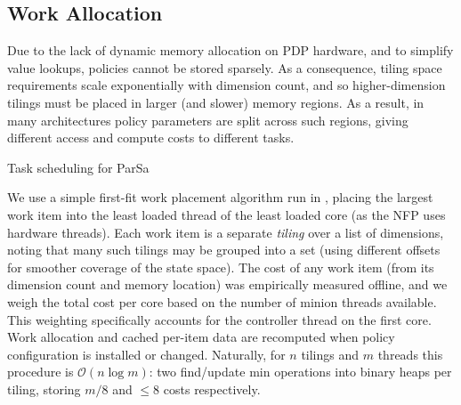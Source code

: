 
\subsection{Work Allocation}\label{sec:work-allocation}
Due to the lack of dynamic memory allocation on PDP hardware, and to simplify value lookups, policies cannot be stored sparsely.
As a consequence, tiling space requirements scale exponentially with dimension count, and so higher-dimension tilings must be placed in larger (and slower) memory regions.
As a result, in many architectures policy parameters are split across such regions, giving different access and compute costs to different tasks.

\begin{algorithm}
	\caption{Task scheduling for ParSa\label{alg:parsa-schedule}}
\end{algorithm}

We use a simple first-fit work placement algorithm run in \approachshort{}, placing the largest work item into the least loaded thread of the least loaded core (as the NFP uses hardware threads).
Each work item is a separate \emph{tiling} over a list of dimensions, noting that many such tilings may be grouped into a set (using different offsets for smoother coverage of the state space).
The cost of any work item (from its dimension count and memory location) was empirically measured offline, and we weigh the total cost per core based on the number of minion threads available.
This weighting specifically accounts for the controller thread on the first core.
Work allocation and cached per-item data are recomputed when policy configuration is installed or changed.
Naturally, for $n$ tilings and $m$ threads this procedure is $\mathcal{O}{\left(n\log{m}\right)}$: two find/update min operations into binary heaps per tiling, storing $m/8$ and $\le8$ costs respectively.

